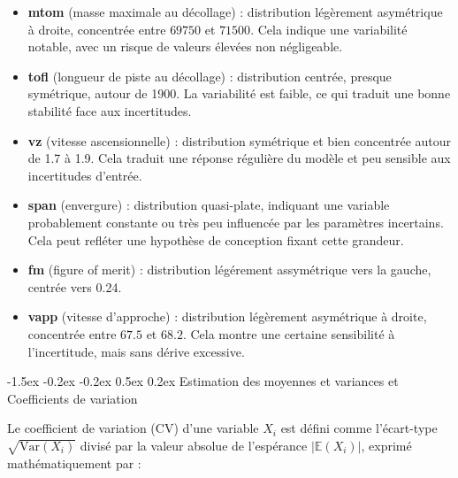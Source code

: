 \documentclass[a4paper, 11pt]{article}
\makeatletter
\newcounter{subsubsubsection}[subsubsection]
\newcommand\subsubsubsection{\@startsection{subsubsubsection}{4}{\z@}%
    {-1.5ex \@plus -0.2ex \@minus -0.2ex}%
    {0.5ex \@plus 0.2ex}%
    {\normalfont\normalsize\bfseries}}%
\makeatother
\begin{document}
\begin{itemize}
    \item \textbf{mtom} (masse maximale au décollage) : distribution légèrement asymétrique à droite, concentrée entre $69750$ et $71500$. Cela indique une variabilité notable, avec un risque de valeurs élevées non négligeable.
    
    \item \textbf{tofl} (longueur de piste au décollage) : distribution centrée, presque symétrique, autour de 1900. La variabilité est faible, ce qui traduit une bonne stabilité face aux incertitudes.
    
    \item \textbf{vz} (vitesse ascensionnelle) : distribution symétrique et bien concentrée autour de 1.7 à 1.9. Cela traduit une réponse régulière du modèle et peu sensible aux incertitudes d’entrée.
    
    \item \textbf{span} (envergure) : distribution quasi-plate, indiquant une variable probablement constante ou très peu influencée par les paramètres incertains. Cela peut refléter une hypothèse de conception fixant cette grandeur.
    
    \item \textbf{fm} (figure of merit) : distribution légérement assymétrique vers la gauche, centrée vers 0.24.
    
    \item \textbf{vapp} (vitesse d’approche) : distribution légèrement asymétrique à droite, concentrée entre $67.5$ et $68.2$. Cela montre une certaine sensibilité à l’incertitude, mais sans dérive excessive.
\end{itemize}


\subsubsubsection{Estimation des moyennes et variances et Coefficients de variation}


Le coefficient de variation (CV) d'une variable $X_i$ est défini comme l'écart-type \(\sqrt{\text{Var}(X_i)}\) divisé par la valeur absolue de l'espérance \(|{\mathbb{E}(X_i)}|\), exprimé mathématiquement par :
\end{document}
